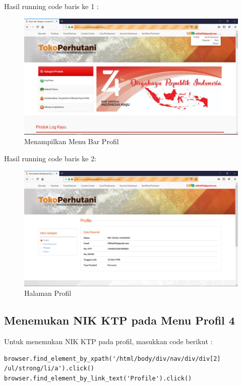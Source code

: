Hasil running code baris ke 1 :
\begin{figure}[h]
	\centering
	\includegraphics[scale=0.28]{figures/1NIK}
	\caption{Menampilkan Menu Bar Profil}
\end{figure}
\newpage
Hasil running code baris ke 2:
\begin{figure}[h]
	\centering
	\includegraphics[scale=0.25]{figures/2NIK}
	\caption{Halaman Profil}
\end{figure}


\subsection {Menemukan NIK KTP pada Menu Profil 4}
Untuk menemukan NIK KTP pada profil, masukkan code berikut :
\begin{verbatim}
browser.find_element_by_xpath('/html/body/div/nav/div/div[2]
/ul/strong/li/a').click()
browser.find_element_by_link_text('Profile').click()
\end{verbatim}

